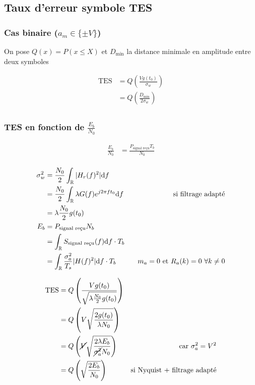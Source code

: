 \documentclass{article}
\begin{document}
\subsection{Taux d'erreur symbole TES}

\subsubsection{Cas binaire ($a_m \in \{\pm V\} $)}

On pose $Q(x) = P(x \le X)$ et $D_{\text{min}}$ la distance minimale en amplitude entre deux symboles

\begin{align*}
    \text{TES} &= Q\left( \frac{Vg(t_0)}{\sigma_w} \right)  \\
    &= Q\left( \frac{D_{\text{min}}}{2\sigma_w} \right)  \\
\end{align*}


\subsubsection{TES en fonction de $\frac{E_b}{N_0}$}

\begin{align*}
    \frac{E_b}{N_0} &= \frac{P_\text{signal reçu} T_b}{N_0} \\
\end{align*}

\begin{align*}
    \sigma_w^2 &= \frac{N_0}{2} \int_{\mathbb{R}} |H_r(f)^2| \mathrm{d}f \\
    &= \frac{N_0}{2} \int_{\mathbb{R}} \lambda G(f) e^{j 2 \pi f t_0} \mathrm{d}f \quad&\text{si filtrage adapté} \\
    &= \lambda \frac{N_0}{2} g(t_0) \\
    E_b &= P_{\text{signal reçu}} N_b \\
    &= \int_{\mathbb{R}} S_{\text{signal reçu}}(f) \mathrm{d}f  \cdot T_b \\
    &= \int_{\mathbb{R}} \frac{\sigma_a^2}{T_s} |H(f)^2| \mathrm{d}f \cdot  T_b \quad&\text{$m_a = 0$ et $R_a(k) = 0 \  \forall k\neq 0$}  \\
\end{align*}


\begin{align*}
    \text{TES} &= Q\left( \frac{V g(t_0)}{\sqrt{\lambda \frac{N_0}{2} g(t_0)} } \right)  \\
    &= Q\left( V \sqrt{\frac{2 g(t_0)}{\lambda N_0}}  \right)  \\
    &= Q\left( \cancel{V} \sqrt{\frac{2 \lambda E_b}{\cancel{\sigma_a^2} N_0}}  \right) \quad&\text{car $\sigma_a^2 = V^2$}  \\
    &=  Q\left( \sqrt{\frac{2 E_b}{N_0}}  \right) \quad&\text{si Nyquist + filtrage adapté} \\
\end{align*}
\end{document}
